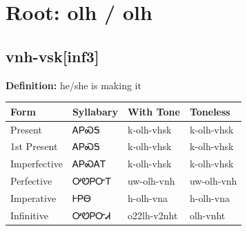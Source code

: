 \documentclass{article}%
\begin{document}
%
\normalsize%
\section*{Root: olh / olh}%
\subsection*{vnh-vsk[inf3]}%
\textbf{Definition: }%
he/she is making it%
\\[0.5em]%
\begin{tabular}{|l|l|l|l|}%
\hline%
\textbf{Form}&\textbf{Syllabary}&\textbf{With Tone}&\textbf{Toneless}\\%
\hline%
Present&ᎪᏢᏍᎦ&k{-}olh{-}vhsk&k{-}olh{-}vhsk\\%
1st Present&ᎪᏢᏍᎦ&k{-}olh{-}vhsk&k{-}olh{-}vhsk\\%
Imperfective&ᎪᏢᏍᎪᎢ&k{-}olh{-}vhsk&k{-}olh{-}vhsk\\%
Perfective&ᎤᏬᏢᏅᎢ&uw{-}olh{-}vnh&uw{-}olh{-}vnh\\%
Imperative&ᎰᏢᎾ&h{-}olh{-}vna&h{-}olh{-}vna\\%
Infinitive&ᎤᏬᏢᏅᏗ&o22lh{-}v2nht&olh{-}vnht\\%
\hline%
\end{tabular}%
\\[1em]%
\end{document}
